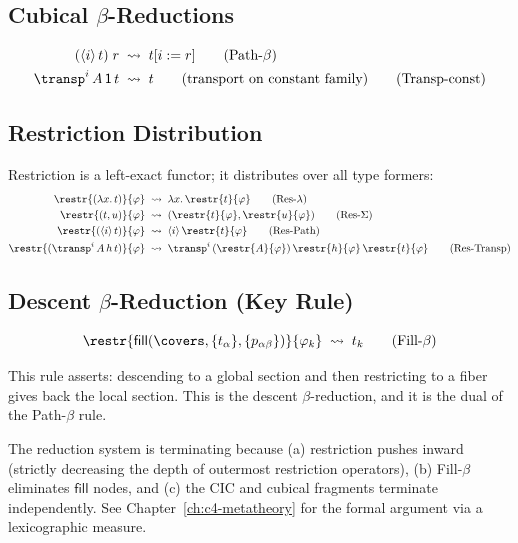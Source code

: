 \subsection{Cubical \(\beta\)-Reductions}

\begin{align}
  (\langle i \rangle\, t)\; r
  &\;\rightsquigarrow\; t[i := r]
  \tag{Path-$\beta$}
  \\
  \transp^i\, A\, \mathsf{1}\, t
  &\;\rightsquigarrow\; t
  \qquad\text{(transport on constant family)}
  \tag{Transp-const}
\end{align}

\subsection{Restriction Distribution}

Restriction is a left-exact functor; it distributes over all
type formers:
\begin{align}
  \restr{(\lambda x.\, t)}{\varphi}
  &\;\rightsquigarrow\; \lambda x.\, \restr{t}{\varphi}
  \tag{Res-$\lambda$}
  \\
  \restr{(t, u)}{\varphi}
  &\;\rightsquigarrow\; (\restr{t}{\varphi}, \restr{u}{\varphi})
  \tag{Res-$\Sigma$}
  \\
  \restr{(\langle i \rangle\, t)}{\varphi}
  &\;\rightsquigarrow\; \langle i \rangle\, \restr{t}{\varphi}
  \tag{Res-Path}
  \\
  \restr{(\transp^i\, A\, h\, t)}{\varphi}
  &\;\rightsquigarrow\;
  \transp^i\, (\restr{A}{\varphi})\, \restr{h}{\varphi}\,
  \restr{t}{\varphi}
  \tag{Res-Transp}
\end{align}

\subsection{Descent \(\beta\)-Reduction (Key Rule)}

\begin{equation}
  \restr{\mathsf{fill}(\covers, \{t_\alpha\}, \{p_{\alpha\beta}\})}{\varphi_k}
  \;\rightsquigarrow\; t_k
  \tag{Fill-$\beta$}
\end{equation}

This rule asserts: descending to a global section and then restricting
to a fiber gives back the local section.  This is the descent
\(\beta\)-reduction, and it is the dual of the
Path-\(\beta\) rule.

\begin{remark}
The reduction system is terminating because (a) restriction
pushes inward (strictly decreasing the depth of outermost
restriction operators), (b) Fill-\(\beta\) eliminates
\(\mathsf{fill}\) nodes, and (c) the CIC and cubical fragments
terminate independently.  See Chapter~\ref{ch:c4-metatheory}
for the formal argument via a lexicographic measure.
\end{remark}



